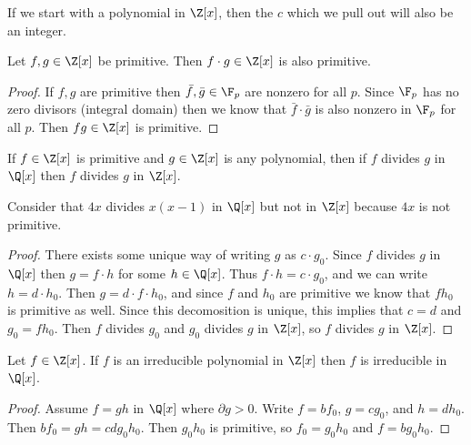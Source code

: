 \begin{lemma}
If we start with a polynomial in $\Z[x]$, then the $c$ which we pull out will also be an integer.
\end{lemma}

\begin{lemma}
Let $f,g \in \Z[x]$ be primitive. Then $f\cdot g \in \Z[x]$ is also primitive.
\end{lemma}

\begin{proof}
If $f,g$ are primitive then $\bar{f}, \bar{g} \in \F_p$ are nonzero for all $p$. Since $\F_p$ has no zero divisors (integral domain) then we know that $\bar{f} \cdot \bar{g}$ is also nonzero in $\F_p$ for all $p$. Then $fg \in \Z[x]$ is primitive.
\end{proof}

\begin{lemma}
If $f \in \Z[x]$ is primitive and $g \in \Z[x]$ is any polynomial, then if $f$ divides $g$ in $\Q[x]$ then $f$ divides $g$ in $\Z[x]$.
\end{lemma}

\begin{example}
Consider that $4x$ divides $x(x-1)$ in $\Q[x]$ but not in $\Z[x]$ because $4x$ is not primitive.
\end{example}

\begin{proof}
There exists some unique way of writing $g$ as $c \cdot g_0$. Since $f$ divides $g$ in $\Q[x]$ then $g = f \cdot h$ for some $h \in \Q[x]$. Thus $f \cdot h = c \cdot g_0$, and we can write $h = d \cdot h_0$. Then $g = d \cdot f \cdot h_0$, and since $f$ and $h_0$ are primitive we know that $fh_0$ is primitive as well. Since this decomosition is unique, this implies that $c = d$ and $g_0 = f h_0$. Then $f$ divides $g_0$ and $g_0$ divides $g$ in $\Z[x]$, so $f$ divides $g$ in $\Z[x]$.
\end{proof}

\begin{lemma}[Gauss]
Let $f \in \Z[x]$. If $f$ is an irreducible polynomial in $\Z[x]$ then $f$ is irreducible in $\Q[x]$.
\end{lemma}

\begin{proof}
Assume $f = gh$ in $\Q[x]$ where $\partial g > 0$. Write $f = bf_0$, $g = cg_0$, and $h = dh_0$. Then $bf_0 = gh = cdg_0h_0$. Then $g_0h_0$ is primitive, so $f_0 = g_0h_0$ and $f = bg_0h_0$.
\end{proof}

